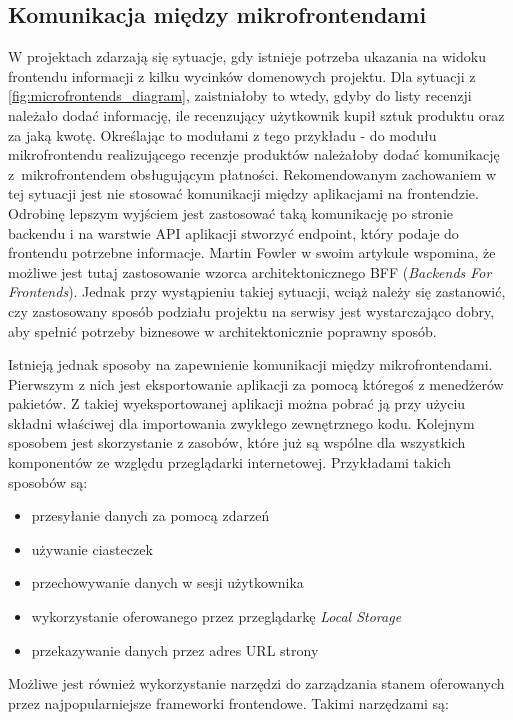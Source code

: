 \documentclass{SGGW-thesis}
\begin{document}
{\subsection{Komunikacja między mikrofrontendami}
W projektach zdarzają się sytuacje, gdy istnieje potrzeba ukazania na widoku frontendu informacji z kilku wycinków domenowych projektu. Dla sytuacji z  \cref{fig:microfrontends_diagram}, zaistniałoby to wtedy, gdyby do listy recenzji należało dodać informację, ile recenzujący użytkownik kupił sztuk produktu oraz za jaką kwotę. Określając to modułami z tego przykładu - do modułu mikrofrontendu realizującego recenzje produktów należałoby dodać komunikację z~mikrofrontendem obsługującym płatności. Rekomendowanym  zachowaniem w tej sytuacji jest nie stosować komunikacji między aplikacjami na frontendzie. Odrobinę lepszym wyjściem jest zastosować taką komunikację po stronie backendu i na warstwie API aplikacji stworzyć endpoint, który podaje do frontendu potrzebne informacje. Martin Fowler w swoim artykule \cite{fowler_2019} wspomina, że możliwe jest tutaj zastosowanie wzorca architektonicznego BFF (\textit{Backends For Frontends}). Jednak przy wystąpieniu takiej sytuacji, wciąż należy się zastanowić, czy zastosowany sposób podziału projektu na serwisy jest wystarczająco dobry, aby spełnić potrzeby biznesowe w architektonicznie poprawny sposób.

Istnieją jednak sposoby na zapewnienie komunikacji między mikrofrontendami. Pierwszym z nich jest eksportowanie aplikacji za pomocą któregoś z menedżerów pakietów. Z takiej wyeksportowanej aplikacji można pobrać ją przy użyciu składni właściwej dla importowania zwykłego zewnętrznego kodu.
Kolejnym sposobem jest skorzystanie z zasobów, które już są wspólne dla wszystkich komponentów ze względu przeglądarki internetowej. Przykładami takich sposobów są:

\begin{itemize}
  \item przesyłanie danych za pomocą zdarzeń
  \item używanie ciasteczek
  \item przechowywanie danych w sesji użytkownika
  \item wykorzystanie oferowanego przez przeglądarkę \textit{Local Storage}
  \item przekazywanie danych przez adres URL strony
\end{itemize}

Możliwe jest również wykorzystanie narzędzi do zarządzania stanem oferowanych przez najpopularniejsze frameworki frontendowe. Takimi narzędzami są:

}
\end{document}
